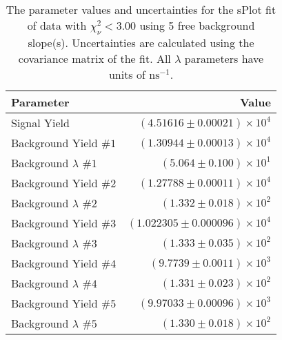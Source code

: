 
\begin{table}
    \begin{center}
        \begin{tabular}{lr}\toprule
            Parameter & Value \\\midrule
            Signal Yield & $(4.51616 \pm 0.00021) \times 10^{4}$ \\
            Background Yield $\#1$ & $(1.30944 \pm 0.00013) \times 10^{4}$ \\
            Background $\lambda$ $\#1$ & $(5.064 \pm 0.100) \times 10^{1}$ \\
            Background Yield $\#2$ & $(1.27788 \pm 0.00011) \times 10^{4}$ \\
            Background $\lambda$ $\#2$ & $(1.332 \pm 0.018) \times 10^{2}$ \\
            Background Yield $\#3$ & $(1.022305 \pm 0.000096) \times 10^{4}$ \\
            Background $\lambda$ $\#3$ & $(1.333 \pm 0.035) \times 10^{2}$ \\
            Background Yield $\#4$ & $(9.7739 \pm 0.0011) \times 10^{3}$ \\
            Background $\lambda$ $\#4$ & $(1.331 \pm 0.023) \times 10^{2}$ \\
            Background Yield $\#5$ & $(9.97033 \pm 0.00096) \times 10^{3}$ \\
            Background $\lambda$ $\#5$ & $(1.330 \pm 0.018) \times 10^{2}$ \\\bottomrule
        \end{tabular}
        \caption{The parameter values and uncertainties for the sPlot fit of data with $\chi^2_\nu < 3.00$ using 5 free background slope(s). Uncertainties are calculated using the covariance matrix of the fit. All $\lambda$ parameters have units of $\si{\nano\second}^{-1}$.}
    \end{center}
\end{table}
